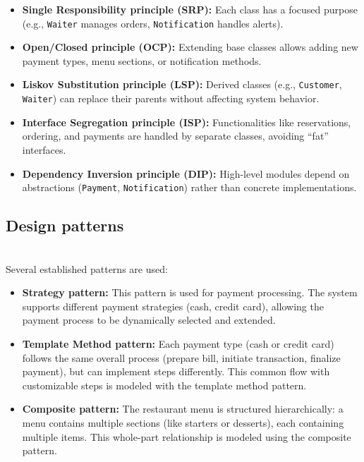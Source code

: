 \begin{itemize}
\item
\protect{}\label{9SEI_2_EV68YI9eneFB5F}
\textbf{Single Responsibility principle (SRP):} Each class has a focused purpose (e.g., \texttt{Waiter} manages orders, \texttt{Notification} handles alerts).
\item
\protect{}\label{K3VQWbfjpf_oy1sc0U1vj}
\textbf{Open/Closed principle (OCP):} Extending base classes allows adding new payment types, menu sections, or notification methods.
\item
\protect{}\label{XrRinhA5307smvcnwY7o-}
\textbf{Liskov Substitution principle (LSP):} Derived classes (e.g., \texttt{Customer}, \texttt{Waiter}) can replace their parents without affecting system behavior.
\item
\protect{}\label{oi9a8hLMTaT_GJFKEdBhF}
\textbf{Interface Segregation principle (ISP):} Functionalities like reservations, ordering, and payments are handled by separate classes, avoiding ``fat'' interfaces.
\item
\protect{}\label{uB1vkUd4XHgrisvIWqK_t}
\textbf{Dependency Inversion principle (DIP):} High-level modules depend on abstractions (\texttt{Payment}, \texttt{Notification}) rather than concrete implementations.
\end{itemize}

\subsection{Design patterns}\label{1_p53MM2SEKL6SbwJx8kg}
\\
Several established patterns are used:

\begin{itemize}
\item
\protect{}\label{NsrxgkptiRCmcb15btZqF}
\textbf{Strategy pattern:} This pattern is used for payment processing. The system supports different payment strategies (cash, credit card), allowing the payment process to be dynamically selected and extended.
\item
\protect{}\label{X4JpgmX1NSTjReVZDT3Rh}
\textbf{Template Method pattern:} Each payment type (cash or credit card) follows the same overall process (prepare bill, initiate transaction, finalize payment), but can implement steps differently. This common flow with customizable steps is modeled with the template method pattern.
\item
\protect{}\label{ssNNM46Ih5FmPuVu9IXOm}
\textbf{Composite pattern:} The restaurant menu is structured hierarchically: a menu contains multiple sections (like starters or desserts), each containing multiple items. This whole-part relationship is modeled using the composite pattern.
\end{itemize}

